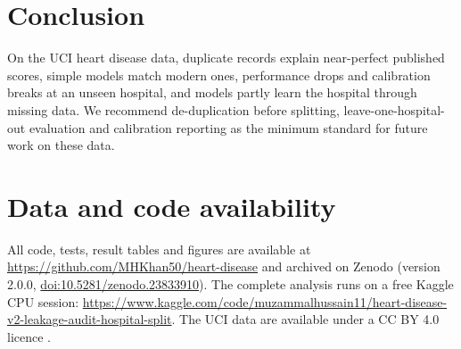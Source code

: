 \documentclass[11pt]{article}
\begin{document}
\section{Conclusion}
On the UCI heart disease data, duplicate records explain near-perfect published scores, simple models match modern ones, performance drops and calibration breaks at an unseen hospital, and models partly learn the hospital through missing data. We recommend de-duplication before splitting, leave-one-hospital-out evaluation and calibration reporting as the minimum standard for future work on these data.

\section*{Data and code availability}
All code, tests, result tables and figures are available at \url{https://github.com/MHKhan50/heart-disease} and archived on Zenodo (version 2.0.0, \href{https://doi.org/10.5281/zenodo.23833910}{doi:10.5281/zenodo.23833910}). The complete analysis runs on a free Kaggle CPU session: \url{https://www.kaggle.com/code/muzammalhussain11/heart-disease-v2-leakage-audit-hospital-split}. The UCI data are available under a CC BY 4.0 licence \citep{uciheart}.



\end{document}
